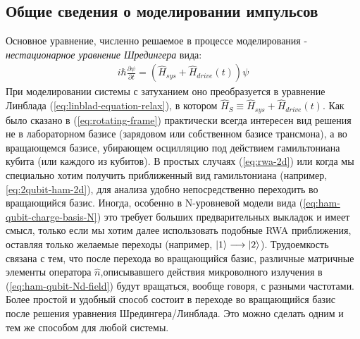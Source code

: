 \documentclass[12pt, twoside]{report}
\DeclarePairedDelimiter\ket{\lvert}{\rangle}
\numberwithin{equation}{section}
\numberwithin{figure}{section}
\begin{document}
\subsection{Общие сведения о моделировании импульсов}
Основное уравнение, численно решаемое в процессе моделирования - \textit{нестационарное уравнение Шредингера} вида: 
\begin{gather}
i \hbar \frac{\partial \psi}{\partial t} = \left( \hat{H}_{sys} + \hat{H}_{drive}\left(t\right) \right) \psi
\label{eq:shrodinger-time-dependent}
\end{gather}
При моделировании системы с затуханием оно преобразуется в уравнение Линблада (\ref{eq:linblad-equation-relax}), в котором $\hat{H}_S \equiv \hat{H}_{sys} + \hat{H}_{drive}(t)$.
Как было сказано в (\ref{eq:rotating-frame}) практически всегда интересен вид решения не в лабораторном базисе (зарядовом или собственном базисе трансмона), а во вращающемся базисе, убирающем осцилляцию под действием гамильтониана кубита (или каждого из кубитов). В простых случаях (\ref{eq:rwa-2d}) или когда мы специально хотим получить приближенный вид гамильтониана (например,\ref{eq:2qubit-ham-2d}),  для анализа удобно непосредственно переходить во вращающийся базис. Иногда, особенно в N-уровневой модели вида (\ref{eq:ham-qubit-charge-basis-N}) это требует больших предварительных выкладок и имеет смысл, только если мы хотим далее использовать подобные RWA приближения, оставляя только желаемые переходы (например, $\ket{1} \longrightarrow \ket{2}$). Трудоемкость связана с тем, что после перехода во вращающийся базис, различные матричные элементы оператора $\hat{n}$,описывавшего действия микроволного излучения в (\ref{eq:ham-qubit-Nd-field}) будут вращаться, вообще говоря, с разными частотами. \newline
 Более простой и удобный способ состоит в переходе во вращающийся базис после решения уравнения Шредингера/Линблада. Это можно сделать одним и тем же способом для любой системы.
\end{document}
